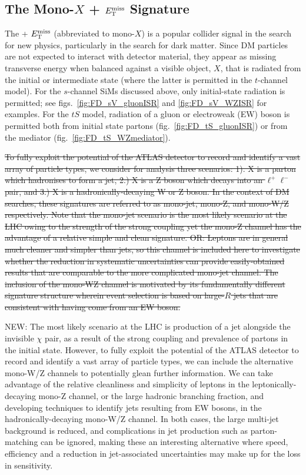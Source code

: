 \subsection{The Mono-$X$ + $E_{\mathrm{T}}^{\mathrm{miss}}$ Signature}
The \monoX + $E_{\mathrm{T}}^{\mathrm{miss}}$ (abbreviated to mono-$X$) is a popular collider signal in the search for new physics, particularly in the search for dark matter. Since DM particles are not expected to interact with detector material, they appear as missing transverse energy when balanced against a visible object, $X$, that is radiated from the initial or intermediate state (where the latter is permitted in the $t$-channel model). For the $s$-channel SiMs discussed above, only initial-state radiation is permitted; see figs.~\ref{fig:FD_sV_gluonISR} and \ref{fig:FD_sV_WZISR} for examples. For the $tS$ model, radiation of a gluon or electroweak (EW) boson is permitted both from initial state partons (fig.~\ref{fig:FD_tS_gluonISR}) or from the mediator (fig.~\ref{fig:FD_tS_WZmediator}).

\st{To fully exploit the potential of the ATLAS detector to record and identify a vast array of particle types, we consider for analysis three scenarios: 1). X is a parton which hadronises to form a jet, 2.) X is a Z boson which decays into an $\ell^+ \ell^-$ pair, and 3.) X is a hadronically-decaying W or Z boson. In the context of DM searches, these signatures are referred to as mono-jet, mono-Z, and mono-W/Z respectively. Note that the mono-jet scenario is the most likely scenario at the LHC owing to the strength of the strong coupling yet the mono-Z channel has the advantage of a relative simple and clean signature. OR: Leptons are in general much cleaner and simpler than jets, so this channel is included here to investigate whether the reduction in systematic uncertainties can provide easily-obtained results that are comparable to the more complicated mono-jet channel. The inclusion of the mono-WZ channel is motivated by its fundamentally different signature structure wherein event selection is based on large-$R$ jets that are consistent with having come from an EW boson.}

NEW: The most likely scenario at the LHC is production of a jet alongside the invisible $\chi$ pair, as a result of the strong coupling and prevalence of partons in the initial state. However, to fully exploit the potential of the ATLAS detector to record and identify a vast array of particle types, we can include the alternative mono-W/Z channels to potentially glean further information. We can take advantage of the relative cleanliness and simplicity of leptons in the leptonically-decaying mono-Z channel, or the large hadronic branching fraction, and developing techniques to identify jets resulting from EW bosons, in the hadronically-decaying mono-W/Z channel. In both cases, the large multi-jet background is reduced, and complications in jet production such as parton-matching can be ignored, making these an interesting alternative where speed, efficiency and a reduction in jet-associated uncertainties may make up for the loss in sensitivity.

